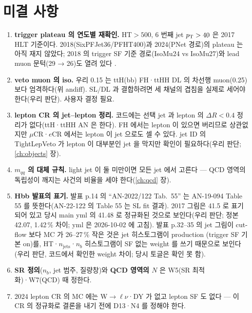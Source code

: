 \section{미결 사항}\label{sec:selection-open}
\begin{openq}
\begin{enumerate}
\item \textbf{trigger plateau 의 연도별 재확인.} HT$>500$, 6 번째 jet $p_{\mathrm{T}}>40$ 은 2017 HLT 기준이다. 2018(SixPFJet36/PFHT400)과 2024(PNet 경로)의
      plateau 는 아직 재지 않았다; 2018 의 trigger SF 기준 경로(IsoMu24 vs IsoMu27)와 lead muon 문턱(29 → 26)도 열려 있다
      .
\item \textbf{veto muon 의 iso.} 우리 0.15 는 ttH(bb) FH·ttHH DL 의 차선행 muon(0.25)보다 엄격하다(위 andiff). SL/DL 과 결합하려면 세 채널의
      겹침을 실제로 세어야 한다(우리 판단). 사용자 결정 필요.
\item \textbf{lepton CR 의 jet–lepton 정리.} 코드에는 선택 jet 과 lepton 의 $\Delta R<0.4$ 정리가 없다(ttH·ttHH AN 은 한다). FH 에서는 lepton 이 있으면
      버리므로 상관없지만 $\mu$CR·$e$CR 에서는 lepton 이 jet 으로도 셀 수 있다. jet ID 의 TightLepVeto 가 lepton 이 대부분인 jet 을 막지만 확인이
      필요하다(우리 판단; \ref{ch:objects} 장).
\item \textbf{$m_{qq}$ 의 대체 규칙.} light jet 이 둘 미만이면 모든 jet 에서 고른다 — QCD 영역의 독립성이 깨지는 사건의 비율을 세야 한다(\ref{ch:qcd} 장).
\item \textbf{Hbb 발표의 표기.} 발표 p.14 의 ``AN-2022/122 Tab.\ 55'' 는 AN-19-094 Table 55 를 뜻한다(AN-22-122 의 Table 55 는 SL fit 결과).
      2017 그림은 41.5\fbinv{} 로 표기되어 있고 당시 main yml 의 41.48 로 정규화된 것으로 보인다(우리 판단; 정본 42.07,
      1.42\,\% 차이; yml 은 2026-10-02 에 고침). 발표 p.32–35 의 jet
      그림이 cut-flow 보다 MC 가 26–27\,\% 작은 것은 jet 히스토그램이 production (trigger SF 기본 on)를, HT·$n_{\text{jets}}$·$n_b$
      히스토그램이 SF 없는 weight 를 쓰기 때문으로 보인다(우리 판단, 코드에서 확인한 weight 차이; 당시 토글은 확인 못 함).
\item \textbf{SR 정의}($n_b$, jet 범주, 질량창)와 \textbf{QCD 영역의 $N$} 은 W5(SR 최적화)·W7(QCD) 때 정한다.
\item 2024 lepton CR 의 MC 에는 W$\to\ell\nu$·DY 가 없고 lepton SF 도 없다 — 이 CR 의 정규화로 결론을 내기 전에 D13·N4 를 정해야 한다.
\end{enumerate}
\end{openq}
